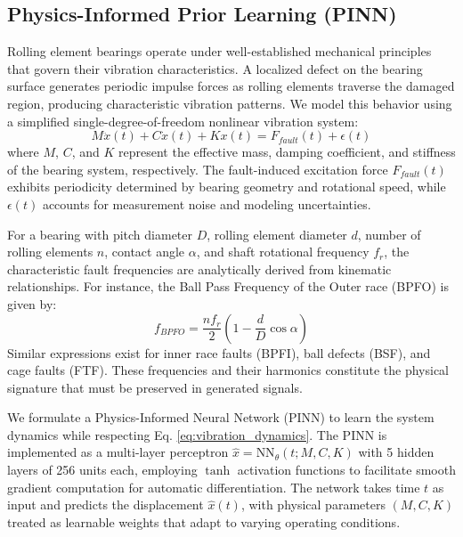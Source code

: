 \subsection{Physics-Informed Prior Learning (PINN)}
Rolling element bearings operate under well-established mechanical principles that govern their vibration characteristics. A localized defect on the bearing surface generates periodic impulse forces as rolling elements traverse the damaged region, producing characteristic vibration patterns. We model this behavior using a simplified single-degree-of-freedom nonlinear vibration system:
\begin{equation}
    M \ddot{x}(t) + C \dot{x}(t) + K x(t) = F_{fault}(t) + \epsilon(t)
    \label{eq:vibration_dynamics}
\end{equation}
where $M$, $C$, and $K$ represent the effective mass, damping coefficient, and stiffness of the bearing system, respectively. The fault-induced excitation force $F_{fault}(t)$ exhibits periodicity determined by bearing geometry and rotational speed, while $\epsilon(t)$ accounts for measurement noise and modeling uncertainties.

For a bearing with pitch diameter $D$, rolling element diameter $d$, number of rolling elements $n$, contact angle $\alpha$, and shaft rotational frequency $f_r$, the characteristic fault frequencies are analytically derived from kinematic relationships. For instance, the Ball Pass Frequency of the Outer race (BPFO) is given by:
\begin{equation}
    f_{BPFO} = \frac{n f_r}{2} \left(1 - \frac{d}{D} \cos \alpha \right)
    \label{eq:bpfo}
\end{equation}
Similar expressions exist for inner race faults (BPFI), ball defects (BSF), and cage faults (FTF). These frequencies and their harmonics constitute the physical signature that must be preserved in generated signals.

We formulate a Physics-Informed Neural Network (PINN) \cite{raissi2019physics} to learn the system dynamics while respecting Eq. \ref{eq:vibration_dynamics}. The PINN is implemented as a multi-layer perceptron $\hat{x} = \text{NN}_\theta(t; M, C, K)$ with 5 hidden layers of 256 units each, employing $\tanh$ activation functions to facilitate smooth gradient computation for automatic differentiation. The network takes time $t$ as input and predicts the displacement $\hat{x}(t)$, with physical parameters $(M, C, K)$ treated as learnable weights that adapt to varying operating conditions.

